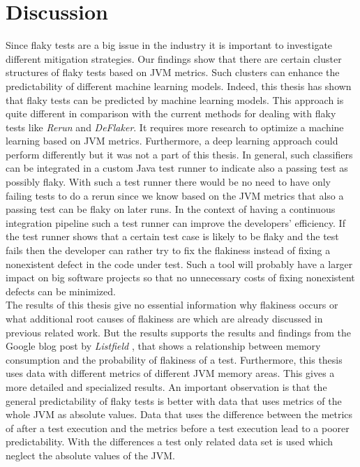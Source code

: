 \documentclass{seal_thesis}
\begin{document}
\chapter{Discussion}
Since flaky tests are a big issue in the industry it is important to investigate different mitigation strategies. Our findings show that there are certain cluster structures of flaky tests based on JVM metrics. Such clusters can enhance the predictability of different machine learning models. Indeed, this thesis has shown that flaky tests can be predicted by machine learning models. This approach is quite different in comparison with the current methods for dealing with flaky tests like \textit{Rerun} and \textit{DeFlaker}. It requires more research to optimize a machine learning based on JVM metrics. Furthermore, a deep learning approach could perform differently but it was not a part of this thesis. In general, such classifiers can be integrated in a custom Java test runner to indicate also a passing test as possibly flaky. With such a test runner there would be no need to have only failing tests to do a rerun since we know based on the JVM metrics that also a passing test can be flaky on later runs. In the context of having a continuous integration pipeline such a test runner can improve the developers' efficiency. If the test runner shows that a certain test case is likely to be flaky and the test fails then the developer can rather try to fix the flakiness instead of fixing a nonexistent defect in the code under test. Such a tool will probably have a larger impact on big software projects so that no unnecessary costs of fixing nonexistent defects can be minimized. \\

\noindent The results of this thesis give no essential information why flakiness occurs or what additional root causes of flakiness are which are already discussed in previous related work. But the results supports the results and findings from the Google blog post by \textit{Listfield} \cite{listfield17}, that shows a relationship between memory consumption and the probability of flakiness of a test. Furthermore, this thesis uses data with different metrics of different JVM memory areas. This gives a more detailed and specialized results. An important observation is that the general predictability of flaky tests is better with data that uses metrics of the whole JVM as absolute values. Data that uses the difference between the metrics of after a test execution and the metrics before a test execution lead to a poorer predictability. With the differences a test only related data set is used which neglect the absolute values of the JVM. \\
\end{document}
